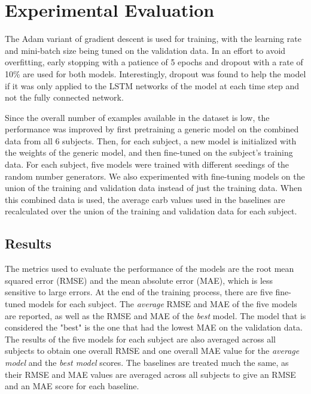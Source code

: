 \documentclass{ecai}
\begin{document}
\section{Experimental Evaluation}

The Adam \cite{kingma:adam} variant of gradient descent is used for training, with the learning rate and mini-batch size being tuned on the validation data. In an effort to avoid overfitting, early stopping with a patience of 5 epochs and dropout with a rate of 10\% are used for both models. Interestingly, dropout was found to help the model if it was only applied to the LSTM networks of the model at each time step and not the fully connected network.

Since the overall number of examples available in the dataset is low, the performance was improved by first pretraining a generic model on the combined data from all 6 subjects. Then, for each subject, a new model is initialized with the weights of the generic model, and then fine-tuned on the subject's training data. For each subject, five models were trained with different seedings of the random number generators. We also experimented with fine-tuning models on the union of the training and validation data instead of just the training data.  When this combined data is used, the average carb values used in the baselines are recalculated over the union of the training and validation data for each subject.

\subsection{Results}

The metrics used to evaluate the performance of the models are the root mean squared error (RMSE) and the mean absolute error (MAE), which is less sensitive to large errors. 
At the end of the training process, there are five fine-tuned models for each subject. The {\it average} RMSE and MAE of the five models are reported, as well as the RMSE and MAE of the {\it best} model. The model that is considered the "best" is the one that had the lowest MAE on the validation data. The results of the five models for each subject are also averaged across all subjects to obtain one overall RMSE and one overall MAE value for the \textit{average model} and the \textit{best model} scores. The baselines are treated much the same, as their RMSE and MAE values are averaged across all subjects to give an RMSE and an MAE score for each baseline. %
\end{document}
